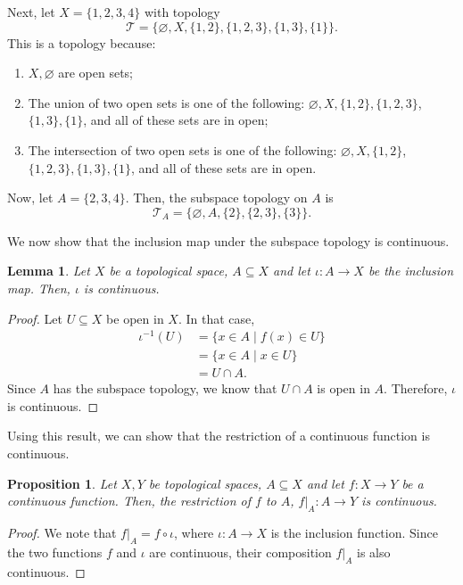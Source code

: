 \documentclass[a4paper, openany]{memoir}
\theoremstyle{definition}
\theoremstyle{plain}
\newtheorem{lemma}[definition]{Lemma}
\newtheorem{proposition}[definition]{Proposition}
\begin{document}
Next, let $X = \{1, 2, 3, 4\}$ with topology
\[\mathcal{T} = \{\varnothing, X, \{1, 2\}, \{1, 2, 3\}, \{1, 3\}, \{1\}\}.\]
This is a topology because:
\begin{enumerate}[label=\textbf{T\arabic*}.]
    \item $X, \varnothing$ are open sets;
    \item The union of two open sets is one of the following: $\varnothing, X, \{1, 2\}, \{1, 2, 3\}$, $\{1, 3\}, \{1\}$, and all of these sets are in open;
    \item The intersection of two open sets is one of the following: $\varnothing, X, \{1, 2\}$, $\{1, 2, 3\}, \{1, 3\}, \{1\}$, and all of these sets are in open.
\end{enumerate}
Now, let $A = \{2, 3, 4\}$. Then, the subspace topology on $A$ is
\[\mathcal{T}_A = \{\varnothing, A, \{2\}, \{2, 3\}, \{3\}\}.\]

We now show that the inclusion map under the subspace topology is continuous.
\begin{lemma}
Let $X$ be a topological space, $A \subseteq X$ and let $\iota: A \to X$ be the inclusion map. Then, $\iota$ is continuous.
\end{lemma}
\begin{proof}
Let $U \subseteq X$ be open in $X$. In that case,
\begin{align*}
    \iota^{-1}(U) &= \{x \in A \mid f(x) \in U\} \\
    &= \{x \in A \mid x \in U\} \\
    &= U \cap A.
\end{align*}
Since $A$ has the subspace topology, we know that $U \cap A$ is open in $A$. Therefore, $\iota$ is continuous.
\end{proof}
\noindent Using this result, we can show that the restriction of a continuous function is continuous.
\begin{proposition}
Let $X, Y$ be topological spaces, $A \subseteq X$ and let $f: X \to Y$ be a continuous function. Then, the restriction of $f$ to $A$, $f|_A: A \to Y$ is continuous.
\end{proposition}
\begin{proof}
We note that $f|_A = f \circ \iota$, where $\iota: A \to X$ is the inclusion function. Since the two functions $f$ and $\iota$ are continuous, their composition $f|_A$ is also continuous.
\end{proof}
\end{document}

